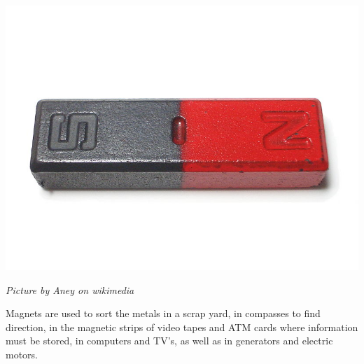 \begin{minipage}{.5\textwidth}
\begin{center}
 \includegraphics[width=.8\textwidth]{photos/magnet.jpg}\par
\textit{Picture by Aney on wikimedia}
\end{center}
\end{minipage}
      \label{m38706*id67200}Magnets are used to sort the metals in a scrap yard, in compasses to find direction, in the magnetic strips of video tapes and ATM cards where information must be stored, in computers and TV's, as well as in generators and electric motors.\par 
\label{m38706*secfhsst!!!underscore!!!id575}
